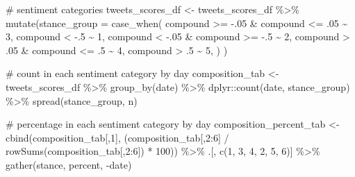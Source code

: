 \documentclass[
  letterpaper,
  DIV=11,
  numbers=noendperiod]{scrreprt}
\newenvironment{Shaded}{\begin{snugshade}}{\end{snugshade}}
\newcommand{\AttributeTok}[1]{\textcolor[rgb]{0.40,0.45,0.13}{#1}}
\newcommand{\CommentTok}[1]{\textcolor[rgb]{0.37,0.37,0.37}{#1}}
\newcommand{\DecValTok}[1]{\textcolor[rgb]{0.68,0.00,0.00}{#1}}
\newcommand{\FunctionTok}[1]{\textcolor[rgb]{0.28,0.35,0.67}{#1}}
\newcommand{\NormalTok}[1]{\textcolor[rgb]{0.00,0.23,0.31}{#1}}
\newcommand{\OtherTok}[1]{\textcolor[rgb]{0.00,0.23,0.31}{#1}}
\newcommand{\SpecialCharTok}[1]{\textcolor[rgb]{0.37,0.37,0.37}{#1}}
\begin{document}
\begin{Shaded}
\begin{Highlighting}[]
\CommentTok{\# sentiment categories}
\NormalTok{tweets\_scores\_df }\OtherTok{\textless{}{-}}\NormalTok{ tweets\_scores\_df }\SpecialCharTok{\%\textgreater{}\%} 
  \FunctionTok{mutate}\NormalTok{(}\AttributeTok{stance\_group =}
           \FunctionTok{case\_when}\NormalTok{(}
\NormalTok{           compound }\SpecialCharTok{\textgreater{}=} \SpecialCharTok{{-}}\NormalTok{.}\DecValTok{05} \SpecialCharTok{\&}\NormalTok{ compound }\SpecialCharTok{\textless{}=}\NormalTok{ .}\DecValTok{05} \SpecialCharTok{\textasciitilde{}} \DecValTok{3}\NormalTok{,}
\NormalTok{           compound }\SpecialCharTok{\textless{}} \SpecialCharTok{{-}}\NormalTok{.}\DecValTok{5} \SpecialCharTok{\textasciitilde{}} \DecValTok{1}\NormalTok{,}
\NormalTok{           compound }\SpecialCharTok{\textless{}} \SpecialCharTok{{-}}\NormalTok{.}\DecValTok{05} \SpecialCharTok{\&}\NormalTok{ compound }\SpecialCharTok{\textgreater{}=} \SpecialCharTok{{-}}\NormalTok{.}\DecValTok{5} \SpecialCharTok{\textasciitilde{}} \DecValTok{2}\NormalTok{,}
\NormalTok{           compound }\SpecialCharTok{\textgreater{}}\NormalTok{ .}\DecValTok{05} \SpecialCharTok{\&}\NormalTok{ compound }\SpecialCharTok{\textless{}=}\NormalTok{ .}\DecValTok{5} \SpecialCharTok{\textasciitilde{}} \DecValTok{4}\NormalTok{,}
\NormalTok{           compound }\SpecialCharTok{\textgreater{}}\NormalTok{ .}\DecValTok{5} \SpecialCharTok{\textasciitilde{}} \DecValTok{5}\NormalTok{,}
\NormalTok{           )}
\NormalTok{         )}

\CommentTok{\# count in each sentiment category by day}
\NormalTok{composition\_tab }\OtherTok{\textless{}{-}}\NormalTok{ tweets\_scores\_df }\SpecialCharTok{\%\textgreater{}\%} 
  \FunctionTok{group\_by}\NormalTok{(date) }\SpecialCharTok{\%\textgreater{}\%} 
\NormalTok{  dplyr}\SpecialCharTok{::}\FunctionTok{count}\NormalTok{(date, stance\_group) }\SpecialCharTok{\%\textgreater{}\%} 
  \FunctionTok{spread}\NormalTok{(stance\_group, n)}

\CommentTok{\# percentage in each sentiment category by day}
\NormalTok{composition\_percent\_tab }\OtherTok{\textless{}{-}} \FunctionTok{cbind}\NormalTok{(composition\_tab[,}\DecValTok{1}\NormalTok{], (composition\_tab[,}\DecValTok{2}\SpecialCharTok{:}\DecValTok{6}\NormalTok{] }\SpecialCharTok{/} \FunctionTok{rowSums}\NormalTok{(composition\_tab[,}\DecValTok{2}\SpecialCharTok{:}\DecValTok{6}\NormalTok{]) }\SpecialCharTok{*} \DecValTok{100}\NormalTok{)) }\SpecialCharTok{\%\textgreater{}\%} 
\NormalTok{  .[, }\FunctionTok{c}\NormalTok{(}\DecValTok{1}\NormalTok{, }\DecValTok{3}\NormalTok{, }\DecValTok{4}\NormalTok{, }\DecValTok{2}\NormalTok{, }\DecValTok{5}\NormalTok{, }\DecValTok{6}\NormalTok{)] }\SpecialCharTok{\%\textgreater{}\%} 
  \FunctionTok{gather}\NormalTok{(stance, percent, }\SpecialCharTok{{-}}\NormalTok{date)}


\end{Highlighting}
\end{Shaded}
\end{document}
